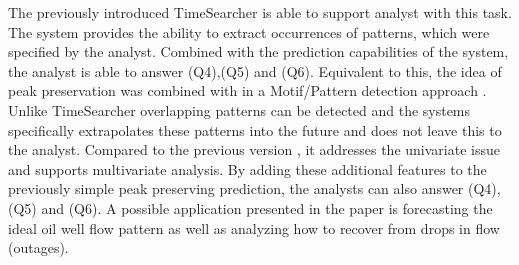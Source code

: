 \documentclass[electronic]{vgtc}             %
\begin{document}
The previously introduced TimeSearcher \cite{Hochheiser:2004, buono:2005, buono:2007} is able to support analyst with this task.
The system provides the ability to extract occurrences of patterns, which were specified by the analyst. 
Combined with the prediction capabilities of the system, the analyst is able to answer (Q4),(Q5) and (Q6).
Equivalent to this, the idea of peak preservation \cite{Hao:2009, Hao:2011} was combined with in a Motif/Pattern detection approach \cite{Hao:2012}.
Unlike TimeSearcher \cite{Hochheiser:2004, buono:2005, buono:2007} overlapping patterns can be detected and the systems specifically extrapolates these patterns into the future and does not leave this to the analyst.
Compared to the previous version \cite{Hao:2009, Hao:2011}, it addresses the univariate issue and supports multivariate analysis. 
By adding these additional features to the previously simple peak preserving prediction, the analysts can also answer (Q4), (Q5) and (Q6). 
A possible application presented in the paper is forecasting the ideal oil well flow pattern as well as analyzing how to recover from drops in flow (outages).   
\end{document}
